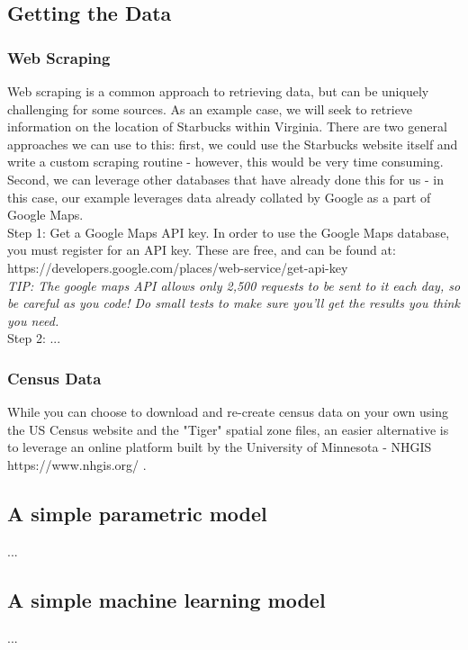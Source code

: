\documentclass[a4paper, 11pt]{article}
\begin{document}
\subsection{Getting the Data}
\subsubsection{Web Scraping}
Web scraping is a common approach to retrieving data, but can be uniquely challenging for some sources.  As an example case, we will seek to retrieve information on the location of Starbucks within Virginia. There are two general approaches we can use to this: first, we could use the Starbucks website itself and write a custom scraping routine - however, this would be very time consuming.  Second, we can leverage other databases that have already done this for us - in this case, our example leverages data already collated by Google as a part of Google Maps.\\
Step 1: Get a Google Maps API key.  In order to use the Google Maps database, you must register for an API key.  These are free, and can be found at: https://developers.google.com/places/web-service/get-api-key\\
\textit{TIP: The google maps API allows only 2,500 requests to be sent to it each day, so be careful as you code!  Do small tests to make sure you'll get the results you think you need.}\\
Step 2: ...

\subsubsection{Census Data}
While you can choose to download and re-create census data on your own using the US Census website and the "Tiger" spatial zone files, an easier alternative is to leverage an online platform built by the University of Minnesota - NHGIS https://www.nhgis.org/ . 

\subsection{A simple parametric model}
...

\subsection{A simple machine learning model}
...
\end{document}
